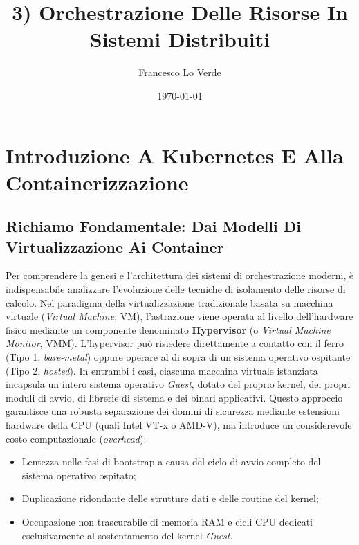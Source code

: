 \documentclass[11pt, a4paper]{article}
\title{3) Orchestrazione Delle Risorse In Sistemi Distribuiti}
\date{\today}
\author{Francesco Lo Verde}
\begin{document}
\maketitle


\section{Introduzione A Kubernetes E Alla Containerizzazione}

\subsection{Richiamo Fondamentale: Dai Modelli Di Virtualizzazione Ai Container}
Per comprendere la genesi e l'architettura dei sistemi di orchestrazione moderni, è indispensabile analizzare l'evoluzione delle tecniche di isolamento delle risorse di calcolo. Nel paradigma della virtualizzazione tradizionale basata su macchina virtuale (\emph{Virtual Machine}, VM), l'astrazione viene operata al livello dell'hardware fisico mediante un componente denominato \textbf{Hypervisor} (o \emph{Virtual Machine Monitor}, VMM). L'hypervisor può risiedere direttamente a contatto con il ferro (Tipo 1, \emph{bare-metal}) oppure operare al di sopra di un sistema operativo ospitante (Tipo 2, \emph{hosted}). In entrambi i casi, ciascuna macchina virtuale istanziata incapsula un intero sistema operativo \emph{Guest}, dotato del proprio kernel, dei propri moduli di avvio, di librerie di sistema e dei binari applicativi. Questo approccio garantisce una robusta separazione dei domini di sicurezza mediante estensioni hardware della CPU (quali Intel VT-x o AMD-V), ma introduce un considerevole costo computazionale (\emph{overhead}):
\begin{itemize}[noitemsep]
    \item Lentezza nelle fasi di bootstrap a causa del ciclo di avvio completo del sistema operativo ospitato;
    \item Duplicazione ridondante delle strutture dati e delle routine del kernel;
    \item Occupazione non trascurabile di memoria RAM e cicli CPU dedicati esclusivamente al sostentamento del kernel \emph{Guest}.
\end{itemize}

\end{document}
